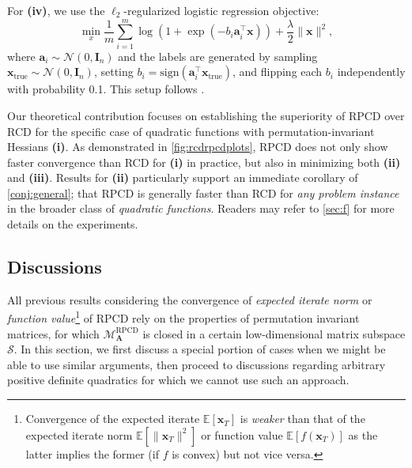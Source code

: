 \documentclass{article}
\theoremstyle{plain}
\theoremstyle{definition}
\theoremstyle{remark}
\def\norm#1{\lVert#1\rVert}
\newcommand{\RPCD}{\text{RPCD}} %
\newcommand{\MARPCD}{\mathcal{M}_{\bm{A}}^{\RPCD}} %
\def\va{{\bm{a}}}
\def\vx{{\bm{x}}}
\def\mI{{\bm{I}}}
\def\gS{{\mathcal{S}}}
\newcommand{\E}{\mathbb{E}}
\begin{document}
For \textbf{(iv)}, we use the $\ell_2$-regularized logistic regression objective:
\[
\min_x \frac{1}{m} \sum_{i=1}^{m} \log(1 + \exp(-b_i \va_i^{\top} \vx)) + \frac{\lambda}{2} \|\vx\|^2,
\]
where $\va_i \sim \mathcal{N}(0, \mI_n)$ and the labels are generated by sampling $\vx_{\text{true}} \sim \mathcal{N}(0, \mI_n)$, setting $b_i = \text{sign}(\va_i^\top \vx_{\text{true}})$, and flipping each $b_i$ independently with probability 0.1. This setup follows \citet{nutini2015}.

Our theoretical contribution focuses on establishing the superiority of RPCD over RCD for the specific case of quadratic functions with permutation-invariant Hessians \textbf{(i)}.
As demonstrated in \cref{fig:rcdrpcdplots}, RPCD does not only show faster convergence than RCD for \textbf{(i)} in practice, but also in minimizing both \textbf{(ii)} and \textbf{(iii)}.
Results for \textbf{(ii)} particularly support an immediate corollary of \cref{conj:general}; that RPCD is generally faster than RCD for \emph{any problem instance} in the broader class of \emph{quadratic functions}.
Readers may refer to \cref{sec:f} for more details on the experiments.


\subsection{Discussions}
\label{sec:4.3}
All previous results considering the convergence of \emph{expected iterate norm} or \emph{function value}\footnote{Convergence of the expected iterate $\E[\vx_T]$ is \emph{weaker} than that of the expected iterate norm $\E [\norm{\vx_T}^2]$ or function value $\E [f(\vx_T)]$ as the latter implies the former (if $f$ is convex) but not vice versa.} of RPCD \citep{lee2019,wright17} rely on the properties of permutation invariant matrices, for which $\MARPCD$ is closed in a certain low-dimensional matrix subspace $\gS$.
In this section, we first discuss a special portion of cases when we might be able to use similar arguments, then proceed to discussions regarding arbitrary positive definite quadratics for which we cannot use such an approach.
\end{document}
